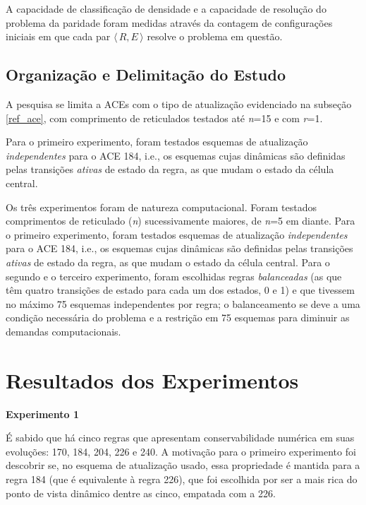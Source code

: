 \documentclass[a4paper,12pt]{ltxdoc}
\newcommand\tab[1][1cm]{\hspace*{#1}}
\begin{document}
\tab A capacidade de classificação de densidade e a capacidade de resolução do problema da paridade foram medidas através da contagem de configurações iniciais em que cada par $\langle\,R,E\,\rangle$ resolve o problema em questão.

\subsection{Organização e Delimitação do Estudo} \label{delimitacao}

A pesquisa se limita a ACEs com o tipo de atualização evidenciado na subseção \ref{ref_ace}, com comprimento de reticulados testados até \textit{n}=15 e com \textit{r}=1. 

\tab Para o primeiro experimento, foram testados esquemas de atualização \textit{independentes} para o ACE 184, i.e., os esquemas cujas dinâmicas são definidas pelas transições \textit{ativas} de estado da regra, as que mudam o estado da célula central. 

\tab Os três experimentos foram de natureza computacional. Foram testados comprimentos de reticulado (\textit{n}) sucessivamente maiores, de \textit{n}=5 em diante. Para o primeiro experimento, foram testados esquemas de atualização \textit{independentes} para o ACE 184, i.e., os esquemas cujas dinâmicas são definidas pelas transições \textit{ativas} de estado da regra, as que mudam o estado da célula central. Para o segundo e o terceiro experimento, foram escolhidas regras \textit{balanceadas} (as que têm quatro transições de estado para cada um dos estados, 0 e 1) e que tivessem no máximo 75 esquemas independentes por regra; o balanceamento se deve a uma condição necessária do problema e a restrição em 75 esquemas para diminuir as demandas computacionais.

\section{Resultados dos Experimentos} \label{resultados}

\textbf{Experimento 1}

É sabido que há cinco regras que apresentam conservabilidade numérica em suas evoluções: 170, 184, 204, 226 e 240. A motivação para o primeiro experimento foi descobrir se, no esquema de atualização usado, essa propriedade é mantida para a regra 184 (que é equivalente à regra 226), que foi escolhida por ser a mais rica do ponto de vista dinâmico dentre as cinco, empatada com a 226.
\end{document}
